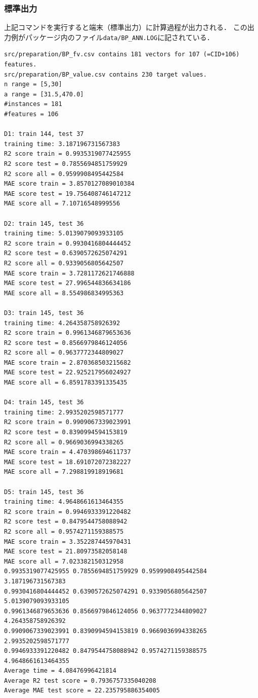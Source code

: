\documentclass[11pt,dvipdfmx,twoside]{jarticle}
\begin{document}
\subsubsection{標準出力}
上記コマンドを実行すると端末（標準出力）に計算過程が出力される．
この出力例がパッケージ内のファイル\verb|data/BP_ANN.LOG|に記されている．
\begin{oframed}
  {\small
\begin{verbatim}
src/preparation/BP_fv.csv contains 181 vectors for 107 (=CID+106) features.
src/preparation/BP_value.csv contains 230 target values.
n range = [5,30]
a range = [31.5,470.0]
#instances = 181
#features = 106

D1: train 144, test 37
training time: 3.187196731567383
R2 score train = 0.9935319077425955
R2 score test = 0.7855694851759929
R2 score all = 0.9599908495442584
MAE score train = 3.8570127089010384
MAE score test = 19.756408746147212
MAE score all = 7.10716548999556

D2: train 145, test 36
training time: 5.0139079093933105
R2 score train = 0.9930416804444452
R2 score test = 0.6390572625074291
R2 score all = 0.9339056805642507
MAE score train = 3.7281172621746888
MAE score test = 27.996544836634186
MAE score all = 8.554986834995363

D3: train 145, test 36
training time: 4.264358758926392
R2 score train = 0.9961346879653636
R2 score test = 0.8566979846124056
R2 score all = 0.9637772344809027
MAE score train = 2.870368503215682
MAE score test = 22.925217956024927
MAE score all = 6.8591783391335435

D4: train 145, test 36
training time: 2.9935202598571777
R2 score train = 0.9909067339023991
R2 score test = 0.8390994594153819
R2 score all = 0.9669036994338265
MAE score train = 4.470398694611737
MAE score test = 18.691072072382227
MAE score all = 7.298819918919681

D5: train 145, test 36
training time: 4.9648661613464355
R2 score train = 0.9946933391220482
R2 score test = 0.8479544758088942
R2 score all = 0.9574271159388575
MAE score train = 3.352287445970431
MAE score test = 21.80973582058148
MAE score all = 7.023382150312958
0.9935319077425955 0.7855694851759929 0.9599908495442584 3.187196731567383
0.9930416804444452 0.6390572625074291 0.9339056805642507 5.0139079093933105
0.9961346879653636 0.8566979846124056 0.9637772344809027 4.264358758926392
0.9909067339023991 0.8390994594153819 0.9669036994338265 2.9935202598571777
0.9946933391220482 0.8479544758088942 0.9574271159388575 4.9648661613464355
Average time = 4.08476996421814
Average R2 test score = 0.7936757335040208
Average MAE test score = 22.235795886354005
  \end{verbatim}        
}
\end{oframed}
\end{document}
